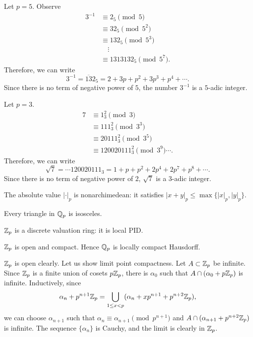 \documentclass{../../large}
\begin{document}
\begin{ex}
Let $p=5$.
Observe
\begin{align*}
3^{-1}&\equiv2_5\pmod5\\
&\equiv32_5\pmod{5^2}\\
&\equiv132_5\pmod{5^3}\\
&\quad\vdots\\
&\equiv1313132_5\pmod{5^7}.
\end{align*}
Therefore, we can write
\[3^{-1}=\overline{13}2_5=2+3p+p^2+3p^3+p^4+\cdots.\]
Since there is no term of negative power of $5$, the number $3^{-1}$ is a $5$-adic integer.
\end{ex}
\begin{ex}
Let $p=3$.
\begin{align*}
7&\equiv1_3^2\pmod3\\
&\equiv111_3^2\pmod{3^3}\\
&\equiv20111_3^2\pmod{3^5}\\
&\equiv120020111_3^2\pmod{3^9}\cdots.
\end{align*}
Therefore, we can write
\[\sqrt7=\cdots120020111_3=1+p+p^2+2p^4+2p^7+p^8+\cdots.\]
Since there is no term of negative power of $2$, $\sqrt7$ is a $3$-adic integer.
\end{ex}

\begin{prb}
\begin{parts}
\item
The absolute value $|\cdot|_p$ is nonarchimedean: it satisfies $|x+y|_p\le\max\{|x|_p,|y|_p\}$.
\item
Every triangle in $\mathbb{Q}_p$ is isosceles.
\item
$\mathbb{Z}_p$ is a discrete valuation ring: it is local PID.
\item
$\mathbb{Z}_p$ is open and compact.
Hence $\mathbb{Q}_p$ is locally compact Hausdorff.
\end{parts}
\end{prb}
\begin{pf}
$\mathbb{Z}_p$ is open clearly.
Let us show limit point compactness.
Let $A\subset\mathbb{Z}_p$ be infinite.
Since $\mathbb{Z}_p$ is a finite union of cosets $p\mathbb{Z}_p$, there is $\alpha_0$ such that $A\cap(\alpha_0+p\mathbb{Z}_p)$ is infinite.
Inductively, since
\[\alpha_n+p^{n+1}\mathbb{Z}_p=\bigcup_{1\le x<p}(\alpha_n+xp^{n+1}+p^{n+2}\mathbb{Z}_p),\]
we can choose $\alpha_{n+1}$ such that $\alpha_n\equiv\alpha_{n+1}\pmod{p^{n+1}}$ and $A\cap(\alpha_{n+1}+p^{n+2}\mathbb{Z}_p)$ is infinite.
The sequence $\{\alpha_n\}$ is Cauchy, and the limit is clearly in $\mathbb{Z}_p$.
\end{pf}
\end{document}
